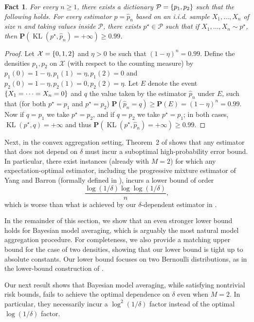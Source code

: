 \documentclass[11pt]{article}
\makeatletter
\renewcommand{\P}{\mathbf P}
\renewcommand{\geq}{\geqslant}
\newcommand{\wh}{\widehat}
\newcommand{\probas}{\mathcal{P}}
\newcommand{\M}{M}
\newcommand{\X}{\mathcal{X}}
\newcommand{\iid}{i.i.d.\@\xspace}
\newcommand{\kl}{\operatorname{KL}}
\newcommand{\kll}[2]{\kl ({#1}, {#2})}
\newtheorem{fact}{Fact}
\theoremstyle{definition}
\theoremstyle{remark}
\DeclarePairedDelimiter{\set}{\{}{\}}
\makeatother
\begin{document}
\begin{fact}
  \label{fac:model-selection-fails}
  For every $n \geq 1$, there exists a dictionary $\probas = \set{p_1, p_2}$ such that the following holds.
  For every estimator $\wh p = \wh p_n$ based on an \iid sample $X_1, \dots, X_n$ of size $n$ and taking values inside $\probas$, there exists $p^\star \in \probas$ such that if $X_1, \dots, X_n \sim p^\star$, then
  $\P (\kll{p^\star}{\wh p_n} = + \infty) \geq 0.99$.
\end{fact}

\begin{proof}
  Let $\X = \set{0, 1, 2}$ and $\eta > 0$ be such that $(1-\eta)^n = 0.99$.
  Define the densities $p_1, p_2$ on $\X$ (with respect to the counting measure) by $p_1 (0) = 1-\eta, p_1 (1) = \eta, p_1 (2) = 0$  and $p_2 (0) = 1-\eta, p_2 (1) = 0, p_2 (2) = \eta$.
  Let $E$ denote the event $\set{X_1 = \dots = X_n = 0}$ and $q$ the value taken by the estimator $\wh p_n$ under $E$, such that (for both $p^\star = p_1$ and $p^\star = p_2$) $\P (\wh p_n = q) \geq \P (E) = (1-\eta)^n = 0.99$.
  Now if $q = p_1$ we take $p^\star = p_2$, and if $q = p_2$ we take $p^\star = p_1$; in both cases, $\kll{p^\star}{q} = + \infty$ and thus $\P (\kll{p^\star}{\wh p_n} = + \infty) \geq 0.99$.
\end{proof}


Next, in the convex aggregation setting, Theorem~2 of \cite{mourtada2025estimation} shows that any estimator that does not depend on $\delta$ must incur a suboptimal high-probability error bound. In particular, there exist instances (already with $\M=2$) for which any expectation-optimal estimator, including the progressive mixture estimator of Yang and Barron (formally defined in ), incurs a lower bound of order
\[
\frac{\log(1/\delta)\log\log(1/\delta)}{n},
\]
which is worse than what is achieved by our $\delta$-dependent estimator in .

In the remainder of this section, we show that an even stronger lower bound holds for
Bayesian model averaging, which is arguably the most natural model aggregation procedure.
For completeness, we also provide a matching upper bound for the case of two densities, showing that our lower bound is tight up to absolute constants. Our lower bound focuses on two Bernoulli distributions, as in the lower-bound construction of \cite{mourtada2025estimation}.

Our next result shows that Bayesian model averaging, while satisfying nontrivial risk bounds, fails to achieve the optimal dependence on $\delta$ even when $\M=2$. In particular, they necessarily incur a $\log^2(1/\delta)$ factor instead of the optimal $\log(1/\delta)$ factor.
\end{document}
